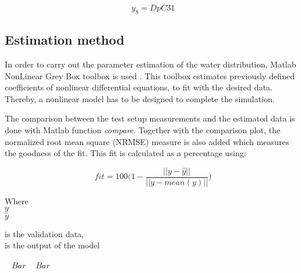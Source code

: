 \vspace{4mm}
\begin {equation}
   y_8 = DpC31 
\end{equation}

 
\subsection{Estimation method} 
\label{MatlabScript}

In order to carry out the parameter estimation of the water distribution, Matlab NonLinear Grey Box toolbox is used \cite{MatlabGreyBox}. This toolbox 
estimates previously defined coefficients of nonlinear differential equations, to fit with the desired data. 
Thereby, a nonlinear model has to be designed to complete the simulation. 

The comparison between the test setup measurements and the estimated data is done with Matlab function \textit{compare}. Together with the comparison 
plot, the normalized root mean square (NRMSE) measure is also added which measures the goodness of the fit. This fit is calculated as a percentage \cite{MatlabFit} using:

\begin{equation}
  fit = 100 \bigg(1 - \frac{||y - \hat{y}||}{||y - mean(y)||}\bigg)
  \label{fitequation}
\end{equation} 

\begin{minipage}[t]{0.20\textwidth}
Where\\
\hspace*{8mm} $y$ \\
\hspace*{8mm} $\hat{y}$ \\
\end{minipage}
\begin{minipage}[t]{0.68\textwidth}
\vspace*{2mm}
is the validation data, \\
is the output of the model\\
\end{minipage}
\begin{minipage}[t]{0.10\textwidth}
\vspace*{2mm}
\textcolor{White}{te}$\unit{Bar}$
\textcolor{White}{te}$\unit{Bar}$
\end{minipage}

